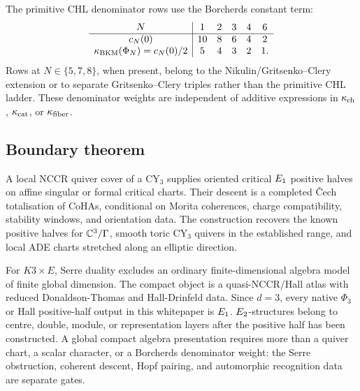 The primitive CHL denominator rows use the Borcherds constant term:
\[
\begin{array}{c|ccccc}
N&1&2&3&4&6\\ \hline
c_N(0)&10&8&6&4&2\\
\kappa_{\mathrm{BKM}}(\Phi_N)=c_N(0)/2&5&4&3&2&1 .
\end{array}
\]
Rows at \(N\in\{5,7,8\}\), when present, belong to the
Nikulin/Gritsenko--Clery extension or to separate Gritsenko--Clery
triples rather than the primitive CHL ladder.  These denominator weights
are independent of additive expressions in \(\kappa_{\mathrm{ch}}\), \(\kappa_{\mathrm{cat}}\), or
\(\kappa_{\mathrm{fiber}}\).

\subsection*{Boundary theorem}

A local NCCR quiver cover of a CY$_3$ supplies oriented critical
\(E_{1}\) positive halves on affine singular or formal critical charts.
Their descent is a completed \v{C}ech totalisation of CoHAs, conditional on
Morita coherences, charge compatibility, stability windows, and
orientation data.  The construction recovers the known positive halves
for \(\mathbb C^3/\Gamma\), smooth toric CY$_3$ quivers in the established
range, and local ADE charts stretched along an elliptic direction.

For \(K3\times E\), Serre duality excludes an ordinary finite-dimensional
algebra model of finite global dimension.  The compact object is a
quasi-NCCR/Hall atlas with reduced
Donaldson-Thomas and Hall-Drinfeld data.  Since \(d=3\), every native
\(\Phi_3\) or Hall positive-half output in this whitepaper is \(E_{1}\).
\(E_{2}\)-structures belong to centre, double, module, or
representation layers after the positive half has been constructed.
A global compact algebra presentation requires more than a quiver chart,
a scalar character, or a Borcherds denominator weight: the Serre
obstruction, coherent descent, Hopf pairing, and automorphic recognition
data are separate gates.

